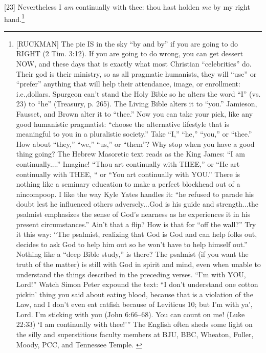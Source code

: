 [23] \textcolor[rgb]{0.00,0.00,1.00}{Nevertheless I \emph{am} continually with thee: thou hast holden \emph{me} by my right hand.}\footnote{[RUCKMAN] The pie IS in the sky “by and by” if you are going to do RIGHT (2 Tim. 3:12). If you are going to do wrong, you can get dessert NOW, and these days that is exactly what most Christian “celebrities” do. Their god is their ministry, so as all pragmatic humanists, they will “use” or “prefer” anything that will help their attendance, image, or enrollment: i.e.,dollars. Spurgeon can’t stand the Holy Bible so he alters the word “I” (vs. 23) to “he” (Treasury, p. 265). The Living Bible alters it to “you.” Jamieson, Fausset, and Brown alter it to “thee.” Now you can take your pick, like any good humanistic pragmatist: “choose the alternative lifestyle that is meaningful to you in a pluralistic society.” Take “I,” “he,” “you,” or “thee.” How about “they,” “we,” “us,” or “them”? Why stop when you have a good thing going? The Hebrew Masoretic text reads as the King James: “I am continually....” Imagine! “Thou art continually with THEE,” or “He art continually with THEE, “ or “You art continually with YOU.” There is nothing like a seminary education to make a perfect blockhead out of a nincompoop. I like the way Kyle Yates handles it: “he refused to parade his doubt lest he influenced others adversely...God is his guide and strength...the psalmist emphasizes the sense of God’s nearness as he experiences it in his present circumstances.” Ain’t that a flip? How is that for “off the wall?” Try it this way: “The psalmist, realizing that God is God and can help folks out, decides to ask God to help him out so he won’t have to help himself out.” Nothing like a “deep Bible study,” is there? The psalmist (if you want the truth of the matter) is still with God in spirit and mind, even when unable to understand the things described in the preceding verses. “I’m with YOU, Lord!” Watch Simon Peter expound the text: “I don’t understand one cotton pickin’ thing you said about eating blood, because that is a violation of the Law, and I don’t even eat catfish because of Leviticus 10; but I’m with ya’, Lord. I’m sticking with you (John 6:66--68). You can count on me! (Luke 22:33) ‘I am continually with thee!’” The English often sheds some light on the silly and superstitious faculty members at BJU, BBC, Wheaton, Fuller, Moody, PCC, and Tennessee Temple.  \cite{Ruckman1992Psalms}  }
